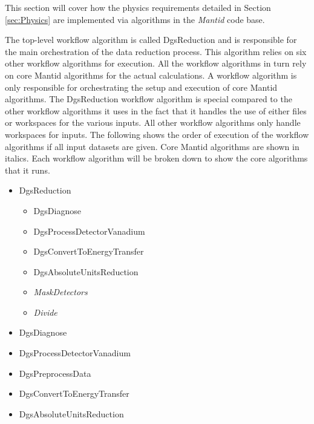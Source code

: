 This section will cover how the physics requirements detailed in Section \ref{sec:Physics} are implemented via algorithms in the \textit{Mantid} code base.

The top-level workflow algorithm is called DgsReduction and is responsible for the main orchestration of the data reduction process. This algorithm relies on six other workflow algorithms for execution. All the workflow algorithms in turn rely on core Mantid algorithms for the actual calculations. A workflow algorithm is only responsible for orchestrating the setup and execution of core Mantid algorithms. The DgsReduction workflow algorithm is special compared to the other workflow algorithms it uses in the fact that it handles the use of either files or workspaces for the various inputs. All other workflow algorithms only handle workspaces for inputs. The following shows the order of execution of the workflow algorithms if all input datasets are given. Core Mantid algorithms are shown in italics. Each workflow algorithm will be broken down to show the core algorithms that it runs. 
\begin{itemize}
\item DgsReduction
\begin{itemize}
\item DgsDiagnose
\item DgsProcessDetectorVanadium
\item DgsConvertToEnergyTransfer
\item DgsAbsoluteUnitsReduction
\item \textit{MaskDetectors}
\item \textit{Divide}
\end{itemize}
\end{itemize}

\begin{itemize}
\item DgsDiagnose
\end{itemize}

\begin{itemize}
\item DgsProcessDetectorVanadium
\end{itemize}

\begin{itemize}
\item DgsPreprocessData
\end{itemize}

\begin{itemize}
\item DgsConvertToEnergyTransfer
\end{itemize}

\begin{itemize}
\item DgsAbsoluteUnitsReduction
\end{itemize}